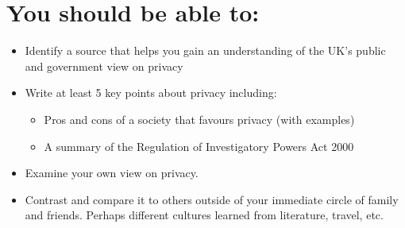 \documentclass{article}
\begin{document}
\section{You should be able to:}
\begin{itemize}
\item Identify a source that helps you gain an understanding of the UK's public and government view on privacy
\item Write at least 5 key points about privacy including:
\begin{itemize}
\item Pros and cons of a society that favours privacy (with examples)
\item A summary of the Regulation of Investigatory Powers Act 2000
\end{itemize}
\item Examine your own view on privacy. 
\item Contrast and compare it to others outside of your immediate circle of family and friends. Perhaps different cultures learned from literature, travel, etc.
\end{itemize}
\end{document}
